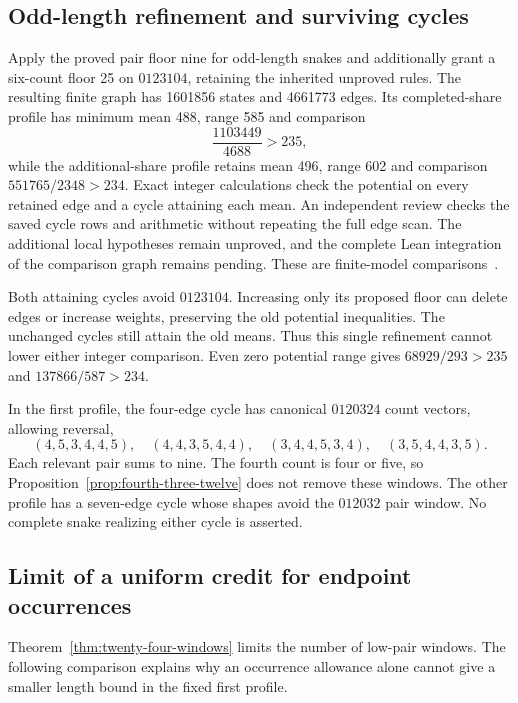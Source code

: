 \documentclass[11pt,a4paper]{article}
\theoremstyle{definition}
\theoremstyle{remark}
\begin{document}
\subsection{Odd-length refinement and surviving cycles}\label{sec:odd-refined-model}
Apply the proved pair floor nine for odd-length snakes and additionally grant
a six-count floor 25 on $0123104$, retaining the inherited unproved rules.
The resulting finite graph has 1601856 states and 4661773 edges. Its
completed-share profile has minimum mean 488, range 585 and comparison
\[
\frac{1103449}{4688}>235,
\]
while the additional-share profile retains mean 496, range 602 and comparison
$551765/2348>234$. Exact integer calculations check the potential on every
retained edge and a cycle attaining each mean. An independent review checks
the saved cycle rows and arithmetic without repeating the full edge scan.
The additional local hypotheses remain unproved, and the complete Lean
integration of the comparison graph remains pending. These are finite-model comparisons~\cite{latercomparisonarchive}.

Both attaining cycles avoid $0123104$. Increasing only its proposed floor
can delete edges or increase weights, preserving the old potential
inequalities. The unchanged cycles still attain the old means. Thus this
single refinement cannot lower either integer comparison. Even zero potential
range gives $68929/293>235$ and $137866/587>234$.

In the first profile, the four-edge cycle has canonical $0120324$ count
vectors, allowing reversal,
\[
(4,5,3,4,4,5),\quad(4,4,3,5,4,4),\quad
(3,4,4,5,3,4),\quad(3,5,4,4,3,5).
\]
Each relevant pair sums to nine. The fourth count is four or five, so
Proposition~\ref{prop:fourth-three-twelve} does not remove these windows.
The other profile has a seven-edge cycle whose shapes avoid the $012032$
pair window. No complete snake realizing either cycle is asserted.

\subsection{Limit of a uniform credit for endpoint occurrences}\label{sec:occurrence-credit-limit}
Theorem~\ref{thm:twenty-four-windows} limits the number of low-pair windows.
The following comparison explains why an occurrence allowance alone cannot
give a smaller length bound in the fixed first profile.
\end{document}
